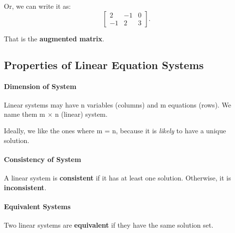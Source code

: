 \documentclass[11pt]{article}
\theoremstyle{definition}
\begin{document}
Or, we can write it as:
\[
\left[
\begin{array}{cc|c}
2 & -1 & 0 \\
-1 & 2 & 3
\end{array}
\right].
\]

That is the \textbf{augmented matrix}.

\subsection{Properties of Linear Equation Systems}


\paragraph{Dimension of System} Linear systems may have n variables (columns) and m equations (rows). We name them m $\times$ n (linear) system.

Ideally, we like the ones where m = n, because it is \textit{likely} to have a unique solution. 

\vspace{0.5em}
\noindent{}

\paragraph{Consistency of System} A linear system is \textbf{consistent} if it has at least one solution. Otherwise, it is \textbf{inconsistent}.


\paragraph{Equivalent Systems} Two linear systems are \textbf{equivalent} if they have the same solution set.


\vspace{0.5em}
\noindent{}
\end{document}
